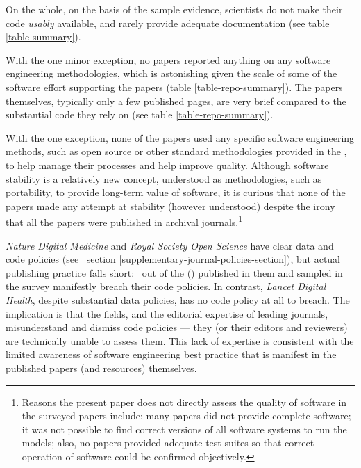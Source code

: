 \documentclass[10pt,a4paper]{article}
\begin{document}
On the whole, on the basis of the sample evidence, scientists do not make their code \emph{usably\/} available, and rarely provide adequate documentation (see table \ref{table-summary}). 

With the one minor exception, no papers reported anything on any software engineering methodologies, which is astonishing given the scale of some of the software effort supporting the papers (table \ref{table-repo-summary}).  The papers themselves, typically only a few published pages, are very brief compared to the substantial code they rely on (see table \ref{table-repo-summary}). 

With the one exception, none of the papers used any specific software engineering methods, such as open source \cite{open-source} or other standard methodologies provided in the \supplement, to help manage their processes and help improve quality. Although software stability \cite{stability} is a relatively new concept, understood as methodologies, such as portability, to provide long-term value of software, it is curious that none of the papers made any attempt at stability (however understood) despite the irony that all the papers were published in archival journals.\footnote{Reasons the present paper does not directly assess the quality of software in the surveyed papers include: many papers did not provide complete software; it was not possible to find correct versions of all software systems to run the models; also, no papers provided adequate test suites so that correct operation of software could be confirmed objectively.}

\emph{Nature Digital Medicine\/} and \emph{Royal Society Open Science\/} have clear data and code policies (see \supplement\ section \ref{supplementary-journal-policies-section}), but actual publishing practice falls short: \the\countHasBreach\ out of the  (\pc{\countHasBreach}{\countHasPolicy}) published in them and sampled in the survey manifestly breach their code policies. In contrast, \emph{Lancet Digital Health\/}, despite substantial data policies, has no code policy at all to breach. The implication is that the fields, and the editorial expertise of leading journals, misunderstand and dismiss code policies --- they (or their editors and reviewers) are technically unable to assess them. This lack of expertise is consistent with the limited awareness of software engineering best practice that is manifest in the published papers (and resources) themselves.
\end{document}
